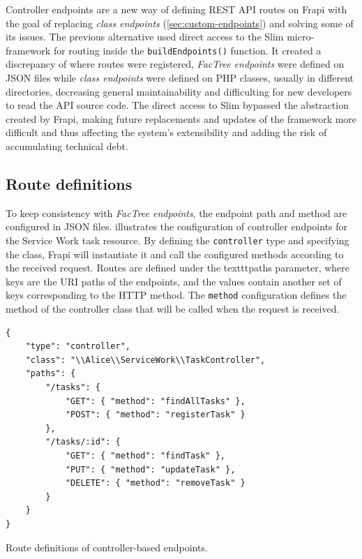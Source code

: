 Controller endpoints are a new way of defining REST API routes on Frapi with the goal of replacing \textit{class endpoints} (\autoref{sec:custom-endpoints}) and solving some of its issues. The previous alternative used direct access to the Slim micro-framework for routing inside the \texttt{buildEndpoints()} function. It created a discrepancy of where routes were registered, \textit{FacTree endpoints} were defined on JSON files while \textit{class endpoints} were defined on PHP classes, usually in different directories, decreasing general maintainability and difficulting for new developers to read the API source code. The direct access to Slim bypassed the abstraction created by Frapi, making future replacements and updates of the framework more difficult and thus affecting the system's extensibility and adding the risk of accumulating technical debt.

\subsection{Route definitions}

To keep consistency with \textit{FacTree endpoints}, the endpoint path and method are configured in JSON files.  illustrates the configuration of controller endpoints for the Service Work task resource. By defining the \texttt{controller} type and specifying the class, Frapi will instantiate it and call the configured methods according to the received request. Routes are defined under the texttt{paths} parameter, where keys are the URI paths of the endpoints, and the values contain another set of keys corresponding to the HTTP method. The \texttt{method} configuration defines the method of the controller class that will be called when the request is received.

\begin{listing}[htbp]
\begin{verbatim}
{
    "type": "controller",
    "class": "\\Alice\\ServiceWork\\TaskController",
    "paths": {
        "/tasks": {
            "GET": { "method": "findAllTasks" },
            "POST": { "method": "registerTask" }
        },
        "/tasks/:id": {
	        "GET": { "method": "findTask" },
            "PUT": { "method": "updateTask" },
            "DELETE": { "method": "removeTask" }
        }
    }
}
\end{verbatim}
\caption{Route definitions of controller-based endpoints.}
\label{code:controller-endpoint-json}
\end{listing}


